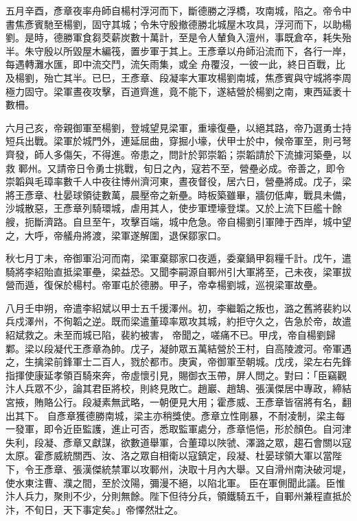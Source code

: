 \begin{pinyinscope}
 五月辛酉，彥章夜率舟師自楊村浮河而下，斷德勝之浮橋，攻南城，陷之。帝令中書焦彥賓馳至楊劉，固守其城；令朱守殷撤德勝北城屋木攻具，浮河而下，以助楊劉。是時，德勝軍食芻茭薪炭數十萬計，至是令人輦負入澶州，事既倉卒，耗失殆半。朱守殷以所毀屋木編筏，置步軍于其上。王彥章以舟師沿流而下，各行一岸，每遇轉灘水匯，即中流交鬥，流矢雨集，或全
 舟覆沒，一彼一此，終日百戰，比及楊劉，殆亡其半。已巳，王彥章、段凝率大軍攻楊劉南城，焦彥賓與守城將李周極力固守。梁軍晝夜攻擊，百道齊進，竟不能下，遂結營於楊劉之南，東西延袤十數柵。



 六月己亥，帝親御軍至楊劉，登城望見梁軍，重壕復壘，以絕其路，帝乃選勇士持短兵出戰。梁軍於城門外，連延屈曲，穿掘小壕，伏甲士於中，候帝軍至，則弓弩齊發，師人多傷矢，不得進。帝患之，問計於郭崇韜；崇韜請於下流據河築壘，以救
 鄆州。又請帝日令勇士挑戰，旬日之內，寇若不至，營壘必成。帝善之，即令崇韜與毛璋率數千人中夜往博州濟河東，晝夜督役，居六日，營壘將成。戊子，梁將王彥章、杜晏球領徒數萬，晨壓帝之新壘。時板築雖畢，牆仞低庳，戰具未備，沙城散惡，王彥章列騎環城，虐用其人，使步軍堙壕登堞。又於上流下巨艦十餘艘，扼斷濟路。自旦至午，攻擊百端，城中危急。帝自楊劉引軍陣于西岸，城中望之，大呼，帝艤舟將渡，梁軍遂解圍，退保鄒家口。



 秋七月丁未，帝御軍沿河而南，梁軍棄鄒家口夜遁，委棄鍋甲芻糧千計。戊午，遣騎將李紹貽直抵梁軍壘，梁益恐。又聞李嗣源自鄆州引大軍將至，己未夜，梁軍拔營而遁，復保於楊村。帝軍屯於德勝。甲子，帝幸楊劉城，巡視梁軍故壘。



 八月壬申朔，帝遣李紹斌以甲士五千援澤州。初，李繼韜之叛也，潞之舊將裴約以兵戍澤州，不徇韜之逆。既而梁遣董璋率眾攻其城，約拒守久之，告急於帝，故遣紹斌救之。未至而城已陷，裴約被害，
 帝聞之，嗟痛不已。甲戌，帝自楊劉歸鄴。梁以段凝代王彥章為帥。戊子，凝帥眾五萬結營於王村，自高陵渡河。帝軍遇之，生擒梁前鋒軍士二百人，戮於都市。庚寅，帝御軍至朝城。戊戌，梁左右先鋒指揮使康延孝領百騎來奔，帝虛懷引見，賜御衣玉帶，屏人問之。對曰：「臣竊觀汴人兵眾不少，論其君臣將校，則終見敗亡。趙巖、趙鵠、張漢傑居中專政，締結宮掖，賄賂公行。段凝素無武略，一朝便見大用；霍彥威、王彥章皆宿將有名，翻出其下。
 自彥章獲德勝南城，梁主亦稍獎使。彥章立性剛暴，不耐凌制，梁主每一發軍，即令近臣監護，進止可否，悉取監軍處分，彥章悒悒，形於顏色。自河津失利，段凝、彥章又獻謀，欲數道舉軍，合董璋以陜虢、澤潞之眾，趨石會關以寇太原。霍彥威統關西、汝、洛之眾自相衛以寇鎮定，段凝、杜晏球領大軍以當陛下，令王彥章、張漢傑統禁軍以攻鄆州，決取十月內大舉。又自滑州南決破河堤，使水東注曹、濮之間，至於汶陽，彌漫不絕，以陷北軍。
 臣在軍側聞此議。臣惟汴人兵力，聚則不少，分則無餘。陛下但待分兵，領鐵騎五千，自鄆州兼程直抵於汴，不旬日，天下事定矣。」帝懌然壯之。




\end{pinyinscope}
